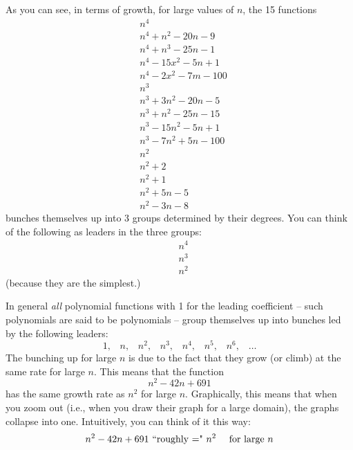 As you can see, in terms of growth, for large values of $n$, the 15 functions
\begin{align*}
&n^4 \\
&n^4 + n^2 - 20n - 9 \\
&n^4 +  n^3 - 25n - 1 \\
&n^4 - 15x^2 - 5n + 1 \\
&n^4 - 2x^2 - 7m - 100 \\
&n^3 \\
&n^3 + 3n^2 - 20n - 5 \\
&n^3 +   n^2 - 25n - 15 \\
&n^3 - 15n^2 - 5n + 1 \\
&n^3 - 7n^2 + 5n - 100 \\
&n^2 \\
&n^2 + 2 \\
&n^2 + 1 \\
&n^2 + 5n - 5 \\
&n^2 - 3n - 8
\end{align*}
bunches themselves up into 3 groups determined by their degrees.
You can think of the following as leaders in the three groups:
\begin{align*}
&n^4 \\
&n^3 \\
&n^2
\end{align*}
(because they are the simplest.)

In general \textit{all} polynomial functions with 1 for the leading coefficient -- such polynomials
are said to be  polynomials -- 
group themselves up into
bunches led by the following leaders:
\[
1, \,\,\,\,\,
n, \,\,\,\,\,
n^2, \,\,\,\,\,
n^3, \,\,\,\,\,
n^4, \,\,\,\,\,
n^5, \,\,\,\,\,
n^6, \,\,\,\,\,
\ldots
\]
The bunching up for large $n$ is due to the fact that they grow (or climb) at the same rate for large $n$.
This means that the function
\[
n^2 - 42n + 691
\]
has the same growth rate as $n^2$ for large $n$.
Graphically, this means that when you zoom out (i.e., when you draw their graph for a
large domain), the graphs collapse into one.
Intuitively, you can think of it this way:
\[
\text{$n^2 - 42n + 691$ \lq\lq roughly $=$" $n^2$ \,\,\,\,\ for large $n$}
\]

